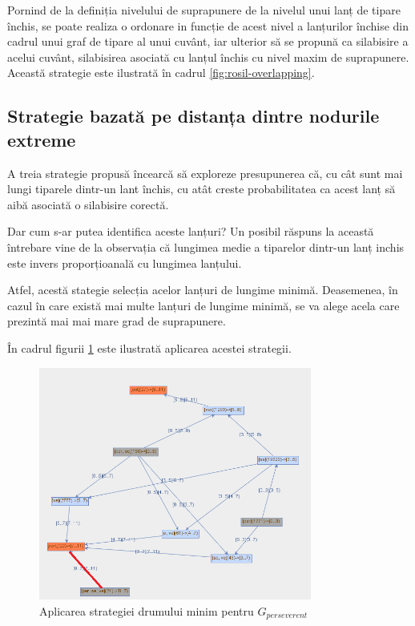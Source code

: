 Pornind de la definiția nivelului de suprapunere de la nivelul unui lanț de tipare închis, se poate realiza o ordonare in funcție de acest nivel a lanțurilor închise din cadrul unui graf de tipare al unui cuvânt, iar ulterior să se propună ca silabisire a acelui cuvânt, silabisirea asociată cu lanțul închis cu nivel maxim de suprapunere. Această strategie este ilustrată în cadrul \ref{fig:rosil-overlapping}.




\subsection{Strategie bazată pe distanța dintre nodurile extreme}

A treia strategie propusă încearcă să exploreze presupunerea că, cu cât sunt mai lungi tiparele dintr-un lant închis, cu atât creste probabilitatea ca acest lanț să aibă asociată o silabisire corectă.

Dar cum s-ar putea identifica aceste lanțuri? Un posibil răspuns la această întrebare vine de la observația că lungimea medie a tiparelor dintr-un lanț inchis este invers proporțioanală cu lungimea lanțului. 

Atfel, acestă stategie selecția acelor lanțuri de lungime minimă. Deasemenea, în cazul în care există mai multe lanțuri de lungime minimă, se va alege acela care prezintă mai mai mare grad de suprapunere. 

\begin{ex}
În cadrul figurii \ref{fig:rosil-shortest} este ilustrată aplicarea acestei strategii. 
\end{ex}

\begin{figure}[h]
    \centering
    \includegraphics[width=0.8\textwidth]{figures/rosil-shortest.png}
    \caption{Aplicarea strategiei drumului minim pentru $G_{perseverent}$}
    \label{fig:rosil-shortest}
\end{figure}

